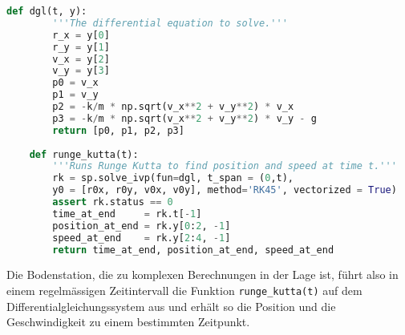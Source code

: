 \begin{lstlisting}[language=Python]
    def dgl(t, y):
        '''The differential equation to solve.'''
        r_x = y[0]
        r_y = y[1]
        v_x = y[2]
        v_y = y[3]
        p0 = v_x
        p1 = v_y
        p2 = -k/m * np.sqrt(v_x**2 + v_y**2) * v_x
        p3 = -k/m * np.sqrt(v_x**2 + v_y**2) * v_y - g
        return [p0, p1, p2, p3]
    
    def runge_kutta(t):
        '''Runs Runge Kutta to find position and speed at time t.'''
        rk = sp.solve_ivp(fun=dgl, t_span = (0,t), 
        y0 = [r0x, r0y, v0x, v0y], method='RK45', vectorized = True)
        assert rk.status == 0
        time_at_end     = rk.t[-1]
        position_at_end = rk.y[0:2, -1]
        speed_at_end    = rk.y[2:4, -1]
        return time_at_end, position_at_end, speed_at_end
    \end{lstlisting}

    Die Bodenstation, die zu komplexen Berechnungen in der Lage ist, führt also in einem regelmässigen Zeitintervall die Funktion \lstinline[language=Python]{runge_kutta(t)} auf dem Differentialgleichungssystem aus und erhält so die Position und die Geschwindigkeit zu einem bestimmten Zeitpunkt.
